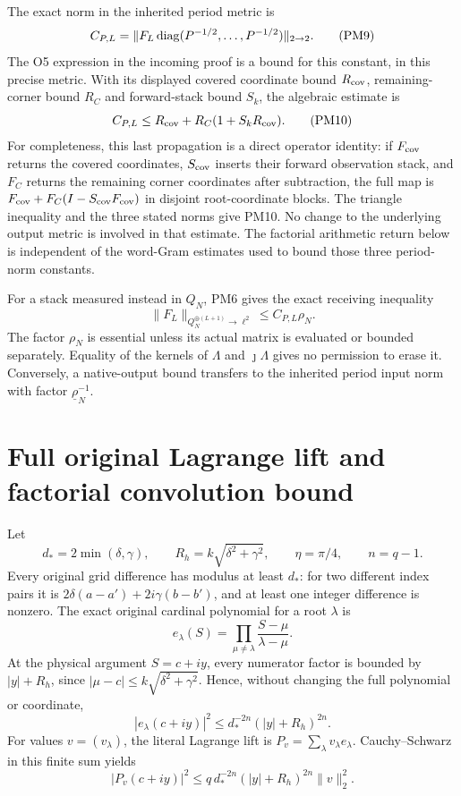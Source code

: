 \documentclass[11pt]{article}
\begin{document}
The exact norm in the inherited period metric is
\[
 C_{P,L}=\|F_L\operatorname{diag}(P^{-1/2},\ldots,P^{-1/2})\|_{2\to2}.       \tag{PM9}
\]
The O5 expression in the incoming proof is a bound for this
constant, in this precise metric.  With its displayed covered
coordinate bound $R_{\rm cov}$, remaining-corner bound $R_C$
and forward-stack bound $S_k$, the algebraic estimate is
\[
 C_{P,L}\le R_{\rm cov}+R_C(1+S_kR_{\rm cov}).                  \tag{PM10}
\]
For completeness, this last propagation is a direct operator
identity: if $F_{\rm cov}$ returns the covered coordinates,
$S_{\rm cov}$ inserts their forward observation stack, and
$F_C$ returns the remaining corner coordinates after subtraction,
the full map is
$F_{\rm cov}+F_C(I-S_{\rm cov}F_{\rm cov})$ in disjoint
root-coordinate blocks.  The triangle inequality and the three
stated norms give PM10.  No change to the underlying output
metric is involved in that estimate.  The factorial arithmetic
return below is independent of the word-Gram estimates used to
bound those three period-norm constants.

For a stack measured instead in $Q_N$, PM6 gives the exact
receiving inequality
\[
 \boxed{\|F_L\|_{Q_N^{\oplus(L+1)}\to\ell^2}
                      \le C_{P,L}\rho_N.}                     \tag{PM11}
\]
The factor $\rho_N$ is essential unless its actual matrix is
evaluated or bounded separately.  Equality of the kernels of
$\Lambda$ and $\jmath\Lambda$ gives no permission to erase it.
Conversely, a native-output bound transfers to the inherited
period input norm with factor $\underline\rho_N^{-1}$.

\section{Full original Lagrange lift and factorial convolution bound}
Let
\[
 d_*=2\min(\delta,\gamma),\qquad
 R_h=k\sqrt{\delta^2+\gamma^2},\qquad
 \eta=\pi/4,\qquad n=q-1.                                     \tag{PM12}
\]
Every original grid difference has modulus at least $d_*$:
for two different index pairs it is
$2\delta(a-a')+2i\gamma(b-b')$, and at least one integer
difference is nonzero.  The exact original cardinal polynomial
for a root $\lambda$ is
\[
 e_\lambda(S)=\prod_{\mu\ne\lambda}
                         \frac{S-\mu}{\lambda-\mu}.
\]
At the physical argument $S=c+iy$, every numerator factor is
bounded by $|y|+R_h$, since
$|\mu-c|\le k\sqrt{\delta^2+\gamma^2}$.  Hence, without changing
the full polynomial or coordinate,
\[
 |e_\lambda(c+iy)|^2
              \le d_*^{-2n}(|y|+R_h)^{2n}.                     \tag{PM13}
\]
For values $v=(v_\lambda)$, the literal Lagrange lift is
$P_v=\sum_\lambda v_\lambda e_\lambda$.  Cauchy--Schwarz in
this finite sum yields
\[
 |P_v(c+iy)|^2\le q\,d_*^{-2n}(|y|+R_h)^{2n}\|v\|_2^2.       \tag{PM14}
\]
\end{document}
